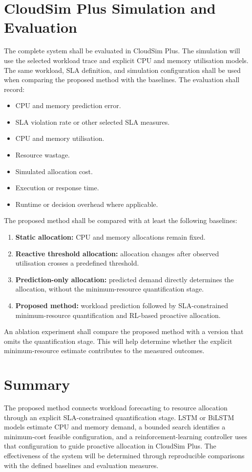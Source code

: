 \documentclass[12pt,a4paper]{report}
\begin{document}
\section{CloudSim Plus Simulation and Evaluation}
The complete system shall be evaluated in CloudSim Plus. The simulation will use the selected workload trace and explicit CPU and memory utilisation models. The same workload, SLA definition, and simulation configuration shall be used when comparing the proposed method with the baselines.
The evaluation shall record:
\begin{itemize}
    \item CPU and memory prediction error.
    \item SLA violation rate or other selected SLA measures.
    \item CPU and memory utilisation.
    \item Resource wastage.
    \item Simulated allocation cost.
    \item Execution or response time.
    \item Runtime or decision overhead where applicable.
\end{itemize}
The proposed method shall be compared with at least the following baselines:
\begin{enumerate}
    \item \textbf{Static allocation:} CPU and memory allocations remain fixed.
    \item \textbf{Reactive threshold allocation:} allocation changes after observed utilisation crosses a predefined threshold.
    \item \textbf{Prediction-only allocation:} predicted demand directly determines the allocation, without the minimum-resource quantification stage.
    \item \textbf{Proposed method:} workload prediction followed by SLA-constrained minimum-resource quantification and RL-based proactive allocation.
\end{enumerate}
An ablation experiment shall compare the proposed method with a version that omits the quantification stage. This will help determine whether the explicit minimum-resource estimate contributes to the measured outcomes.

\section{Summary}
The proposed method connects workload forecasting to resource allocation through an explicit SLA-constrained quantification stage. LSTM or BiLSTM models estimate CPU and memory demand, a bounded search identifies a minimum-cost feasible configuration, and a reinforcement-learning controller uses that configuration to guide proactive allocation in CloudSim Plus. The effectiveness of the system will be determined through reproducible comparisons with the defined baselines and evaluation measures.
\end{document}
